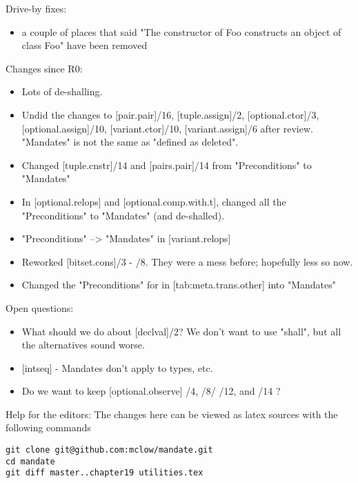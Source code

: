 %
%


Drive-by fixes:
\begin{itemize}
\item{a couple of places that said "The constructor of Foo constructs an object of class Foo" have been removed}
\end{itemize}

Changes since R0:
\begin{itemize}
\item{Lots of de-shalling.}
\item{Undid the changes to [pair.pair]/16, [tuple.assign]/2, [optional.ctor]/3, 
 [optional.assign]/10, [variant.ctor]/10, [variant.assign]/6 after review. "Mandates" is not the same as "defined as deleted".}
\item{Changed [tuple.cnstr]/14 and [pairs.pair]/14 from "Preconditions" to "Mandates"}
\item{In [optional.relops] and [optional.comp.with.t], changed all the "Preconditions" to "Mandates" (and de-shalled).}
\item{"Preconditions" --> "Mandates" in [variant.relops]}
\item{Reworked [bitset.cons]/3 - /8. They were a mess before; hopefully less so now.}
\item{Changed the "Preconditions" for  in [tab:meta.trans.other] into "Mandates"}
\end{itemize}

Open questions:
\begin{itemize}
\item{What should we do about [declval]/2? We don't want to use "shall", but all the alternatives sound worse.}
\item{[intseq] - Mandates don't apply to types, etc.}
\item{Do we want to keep [optional.observe] /4, /8/ /12, and /14 ?}
\end{itemize}

\vfill
Help for the editors: The changes here can be viewed as latex sources with the following commands
\begin{verbatim}
git clone git@github.com:mclow/mandate.git
cd mandate
git diff master..chapter19 utilities.tex
\end{verbatim}
\newpage
